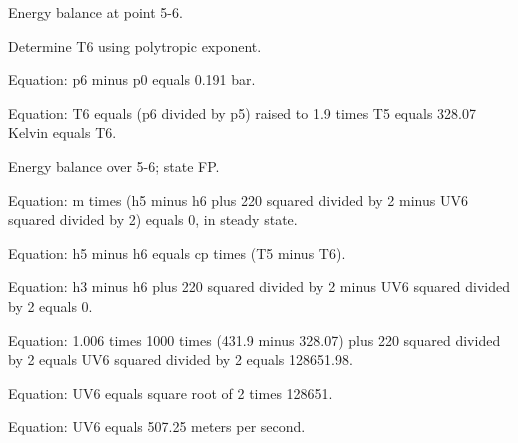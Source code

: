 Energy balance at point 5-6.

Determine T6 using polytropic exponent.

Equation: p6 minus p0 equals 0.191 bar.

Equation: T6 equals (p6 divided by p5) raised to 1.9 times T5 equals 328.07 Kelvin equals T6.

Energy balance over 5-6; state FP.

Equation: m times (h5 minus h6 plus 220 squared divided by 2 minus UV6 squared divided by 2) equals 0, in steady state.

Equation: h5 minus h6 equals cp times (T5 minus T6).

Equation: h3 minus h6 plus 220 squared divided by 2 minus UV6 squared divided by 2 equals 0.

Equation: 1.006 times 1000 times (431.9 minus 328.07) plus 220 squared divided by 2 equals UV6 squared divided by 2 equals 128651.98.

Equation: UV6 equals square root of 2 times 128651.

Equation: UV6 equals 507.25 meters per second.